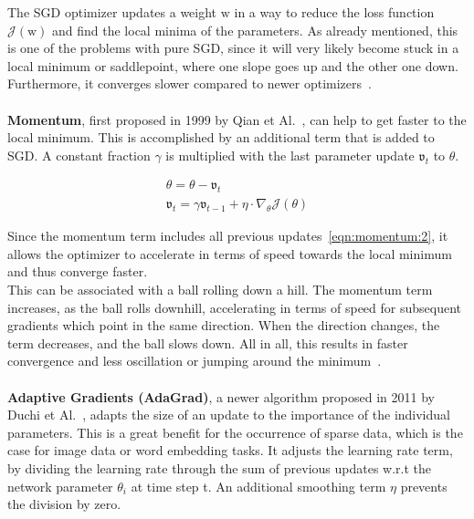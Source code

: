 The SGD optimizer updates a weight $\mathrm{w}$ in a way to reduce the loss function $\mathcal{J}(\mathrm{w})$ and find
the local minima of the parameters.
As already mentioned, this is one of the problems with pure SGD, since it will very likely become stuck in a local minimum or
saddlepoint, where one slope goes up and the other one down.
Furthermore, it converges slower compared to newer optimizers~\cite{optimizersoverview, optimizersexplained}.
\\\mbox{}\\
\textbf{Momentum}, first proposed in 1999 by Qian et Al.~\cite{momentum}, can help to get faster to the local minimum.
This is accomplished by an additional term that is added to SGD.
A constant fraction $\gamma$ is multiplied with the last parameter update $\mathfrak{v}_t$ to $\theta$.

\begin{align}
    \theta = \theta - \mathfrak{v}_t \label{eqn:momentum:1}\\
    \mathfrak{v}_t = \gamma\mathfrak{v}_{t-1} + \eta\cdot\nabla_\theta\mathcal{J}(\theta) \label{eqn:momentum:2}
\end{align}

Since the momentum term includes all previous updates~\ref{eqn:momentum:2}, it allows the optimizer to accelerate in terms of speed towards
the local minimum and thus converge faster.\\
This can be associated with a ball rolling down a hill.
The momentum term increases, as the ball rolls downhill, accelerating in terms of speed for subsequent gradients
which point in the same direction.
When the direction changes, the term decreases, and the ball slows down.
All in all, this results in faster convergence and less oscillation or jumping around the minimum~\cite{optimizersoverview}.
\\\mbox{}\\
\textbf{Adaptive Gradients (AdaGrad)}, a newer algorithm proposed in 2011 by Duchi et Al.~\cite{adagrad},
adapts the size of an update to the importance of the individual parameters.
This is a great benefit for the occurrence of sparse data, which is the case for image data or word embedding tasks.
It adjusts the learning rate term, by dividing the learning rate through the sum
of previous updates w.r.t the network parameter $\theta_i$ at time step t.
An additional smoothing term $\eta$ prevents the division by zero.

